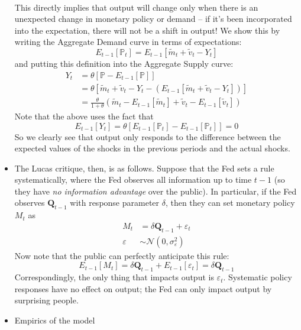 \documentclass[12pt]{article}
\begin{document}
\begin{itemize}
\[\begin{split}
    \end{split}\]
    This directly implies that output will change only when there is an unexpected change in monetary policy or demand -- if it's been incorporated into the expectation, there will not be a shift in output! We show this by writing the Aggregate Demand curve in terms of expectations:
    \[
        E_{t-1}[\mathbb{P}_t] = E_{t-1}[\widetilde{m}_t + \widetilde{v}_t - Y_t]
    \]
    and putting this definition into the Aggregate Supply curve:
    \begin{equation}\label{Lucas AS Shocks}
        \begin{split}
            Y_t &= \theta [\mathbb{P} - E_{t-1}[\mathbb{P}]] \\
            &= \theta [\widetilde{m}_t + \widetilde{v}_t - Y_t - (E_{t-1}[\widetilde{m}_t + \widetilde{v}_t - Y_t])] \\ 
            &= \frac{\theta}{1+\theta}\left(\widetilde{m}_t - E_{t-1}[\widetilde{m}_t] + \widetilde{v}_t - E_{t-1}[\widetilde{v}_t]\right)
        \end{split}
    \end{equation}
    Note that the above uses the fact that
    \[E_{t-1}[Y_t] = \theta[E_{t-1}[\mathbb{P}_t] - E_{t-1}[\mathbb{P}_t]] = 0\]
    So we clearly see that output only responds to the difference between the expected values of the shocks in the previous periods and the actual shocks.
    \item The Lucas critique, then, is as follows. Suppose that the Fed sets a rule systematically, where the Fed observes all information up to time $t-1$ (so they have \textit{no information advantage} over the public). In particular, if the Fed observes $\textbf{Q}_{t-1}$ with response parameter $\delta$, then they can set monetary policy $M_t$ as 
    \[\begin{split}
        M_t &= \delta \textbf{Q}_{t-1} + \varepsilon_t \\
        \varepsilon &\sim \mathcal{N}\left(0, \sigma^2_{\varepsilon}\right)
    \end{split}\]
    Now note that the public can perfectly anticipate this rule:
    \[E_{t-1}[M_t] = \delta \textbf{Q}_{t-1} + E_{t-1}[\varepsilon_t] = \delta \textbf{Q}_{t-1}\]
    Correspondingly, the only thing that impacts output is $\varepsilon_t$. Systematic policy responses have no effect on output; the Fed can only impact output by surprising people.
    \item Empirics of the model
    \begin{enumerate}

\end{enumerate}
\end{itemize}
\end{document}
